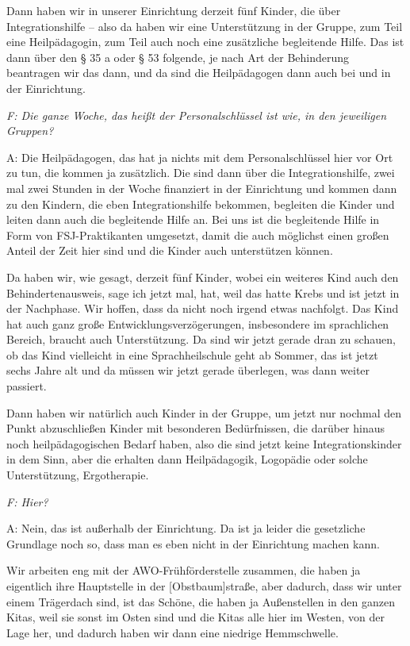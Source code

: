 \begin{linenumbers*}
Dann haben wir in unserer Einrichtung derzeit fünf Kinder, die über Integrationshilfe -- also da haben wir eine Unterstützung in der Gruppe, zum Teil eine Heilpädagogin, zum Teil auch noch eine zusätzliche begleitende Hilfe. Das ist dann über den § 35 a oder § 53 folgende, je nach Art der Behinderung beantragen wir das dann, und da sind die Heilpädagogen dann auch bei und in der Einrichtung. 

\emph{F: Die ganze Woche, das heißt der Personalschlüssel ist wie, in den jeweiligen Gruppen?} 

A: Die Heilpädagogen, das hat ja nichts mit dem Personalschlüssel hier vor Ort zu tun, die kommen ja zusätzlich. Die sind dann über die Integrationshilfe, zwei mal zwei Stunden in der Woche finanziert in der Einrichtung und kommen dann zu den Kindern, die eben Integrationshilfe bekommen, begleiten die Kinder und leiten dann auch die begleitende Hilfe an. Bei uns ist die begleitende Hilfe in Form von FSJ-Praktikanten umgesetzt, damit die auch möglichst einen großen Anteil der Zeit hier sind und die Kinder auch unterstützen können. 

Da haben wir, wie gesagt, derzeit fünf Kinder, wobei ein weiteres Kind auch den Behindertenausweis, sage ich jetzt mal, hat, weil das hatte Krebs und ist jetzt in der Nachphase. Wir hoffen, dass da nicht noch irgend etwas nachfolgt. Das Kind hat auch ganz große Entwicklungsverzögerungen, insbesondere im sprachlichen Bereich, braucht auch Unterstützung. Da sind wir jetzt gerade dran zu schauen, ob das Kind vielleicht in eine Sprachheilschule geht ab Sommer, das ist jetzt sechs Jahre alt und da müssen wir jetzt gerade überlegen, was dann weiter passiert. 

Dann haben wir natürlich auch Kinder in der Gruppe, um jetzt nur nochmal den Punkt abzuschließen Kinder mit besonderen Bedürfnissen, die darüber hinaus noch heilpädagogischen Bedarf haben, also die sind jetzt keine Integrationskinder in dem Sinn, aber die erhalten dann Heilpädagogik, Logopädie oder solche Unterstützung, Ergotherapie.

\emph{F: Hier?} 

A: Nein, das ist außerhalb der Einrichtung. Da ist ja leider die gesetzliche Grundlage noch so, dass man es eben nicht in der Einrichtung machen kann. 

Wir arbeiten eng mit der AWO-Frühförderstelle zusammen, die haben ja eigentlich ihre Hauptstelle in der [Obstbaum]straße, aber dadurch, dass wir unter einem Trägerdach sind, ist das Schöne, die haben ja Außenstellen in den ganzen Kitas, weil sie sonst im Osten sind und die Kitas alle hier im Westen, von der Lage her, und dadurch haben wir dann eine niedrige Hemmschwelle. 


\end{linenumbers*}
